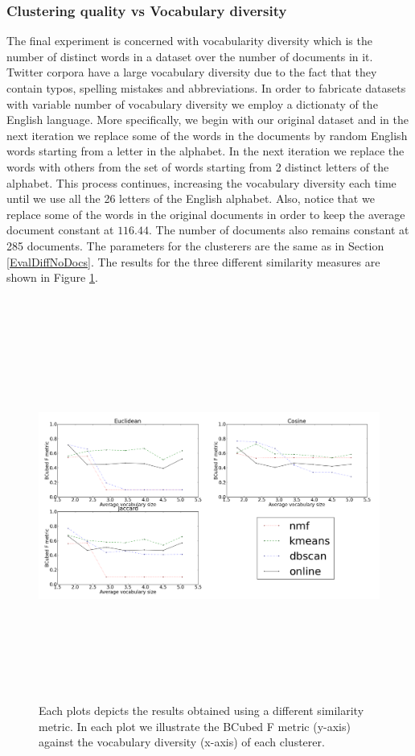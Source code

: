 \subsubsection{Clustering quality vs Vocabulary diversity}
The final experiment is concerned with vocabularity diversity which is the number of distinct words in a dataset over the number of documents in it. Twitter corpora have a large vocabulary diversity due to the fact that they contain typos, spelling mistakes and abbreviations. In order to fabricate datasets with variable number of vocabulary diversity we employ a dictionaty of the English language. More specifically, we begin with our original dataset and in the next iteration we replace some of the words in the documents by random English words starting from a letter in the alphabet. In the next iteration we replace the words with others from the set of words starting from 2 distinct letters of the alphabet. This process continues, increasing the vocabulary diversity each time until we use all the 26 letters of the English alphabet. Also, notice that we replace some of the words in the original documents in order to keep the average document constant at $116.44$. The number of documents also remains constant at 285 documents. The parameters for the clusterers are the same as in Section \ref{EvalDiffNoDocs}. The results for the three different similarity measures are shown in Figure \ref{DifferentVocabularyResults}.\\\\ 
\begin{figure}[htbp]
  \begin{center}
    \includegraphics[height=5in, width=6in]{vocabulary}
    \caption{Each plots depicts the results obtained using a different similarity metric. In each plot we illustrate the BCubed F metric (y-axis) against the vocabulary diversity (x-axis) of each clusterer.}
    \label{DifferentVocabularyResults}
  \end{center}
\end{figure}

